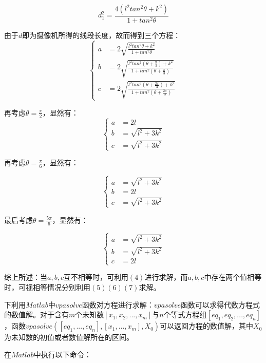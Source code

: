 \documentclass[a4paper,10.5pt]{ctexart}
\begin{document}
$$d_1^2=\frac{4(l^2tan^2\theta+k^2)}{1+tan^2\theta}$$
\par 由于$d$即为摄像机所得的线段长度，故而得到三个方程：
\begin{equation}
\left\{
\begin{aligned}
a&=2\sqrt{\frac{l^2tan^2\theta+k^2}{1+tan^2\theta}}\\
b&=2\sqrt{\frac{l^2tan^2(\theta+\frac{\pi}{3})+k^2}{1+tan^2(\theta+\frac{\pi}{3})}}\\
c&=2\sqrt{\frac{l^2tan^2(\theta+\frac{2\pi}{3})+k^2}{1+tan^2(\theta+\frac{2\pi}{3})}}

\end{aligned}
\right.
\end{equation}
\par 再考虑$\theta=\frac{\pi}{2}$，显然有：
\begin{equation}
\left\{
\begin{aligned}
a&=2l\\
b&=\sqrt{l^2+3k^2}\\
c&=\sqrt{l^2+3k^2}
\end{aligned}
\right.
\end{equation}
\par 再考虑$\theta=\frac{\pi}{6}$，显然有：

\begin{equation}
\left\{
\begin{aligned}
a&=\sqrt{l^2+3k^2}\\
b&=2l\\
c&=\sqrt{l^2+3k^2}
\end{aligned}
\right.
\end{equation}

\par 最后考虑$\theta=\frac{5\pi}{6}$，显然有：

\begin{equation}
\left\{
\begin{aligned}
a&=\sqrt{l^2+3k^2}\\
b&=\sqrt{l^2+3k^2}\\
c&=2l
\end{aligned}
\right.
\end{equation}
\par 综上所述：当$a,b,c$互不相等时，可利用$(4)$进行求解，而$a,b,c$中存在两个值相等时，可视相等情况分别利用$(5)(6)(7)$求解。
\par 下利用$Matlab$中$vpasolve$函数对方程进行求解：$vpasolve$函数可以求得代数方程式的数值解。对于含有$m$个未知数$[x_1,x_2,...,x_m]$与$n$个等式方程组$[eq_1,eq_2,...,eq_n]$，函数$vpasolve([eq_1,...,eq_n],[x_1,...,x_m],X_0)$可以返回方程的数值解，其中$X_0$为未知数的初值或者数值解所在的区间。
\par 在$Matlab$中执行以下命令：
\end{document}
